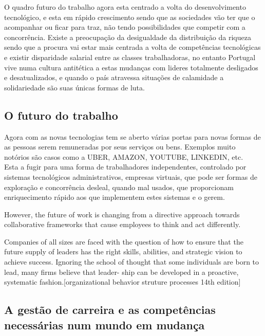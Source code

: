O quadro futuro do trabalho agora esta centrado a volta do desenvolvimento tecnológico, e esta em rápido crescimento sendo que as sociedades vão ter que o acompanhar ou ficar para traz, não tendo possibilidades que competir com a concorrência. Existe a preocupação da desigualdade da distribuição da riqueza sendo que a procura vai estar mais centrada a volta de competências tecnológicas e existir disparidade salarial entre as classes trabalhadoras, no entanto Portugal vive numa cultura antitética a estas mudanças com lideres totalmente desligados e desatualizados, e quando o país atravessa situações de calamidade a solidariedade são suas únicas formas de luta.
















\subsection{O futuro do trabalho}
\qquad Agora com as novas tecnologias tem se aberto várias portas para novas formas de as pessoas serem remuneradas por seus serviços ou bens. Exemplos muito notórios são casos como a UBER, AMAZON, YOUTUBE, LINKEDIN, etc.\\

Esta a fugir para uma forma de trabalhadores independentes, controlado por sistemas tecnológicos administrativos, empresas virtuais, que pode ser formas de exploração e concorrência desleal, quando mal usados, que proporcionam enriquecimento rápido aos que implementem estes sistemas e o gerem.

However, the future of work is changing from a directive approach towards collaborative frameworks that cause employees to think and act differently.


Companies of all sizes are faced with the question of how to ensure that the future supply of leaders has the right skills, abilities, and strategic vision to achieve success. Ignoring the school of thought that some individuals are born to lead, many firms believe that leader- ship can be developed in a proactive, systematic fashion.[organizational behavior struture processes 14th edition]


\subsection{A gestão de carreira e as competências necessárias num mundo em mudança}


